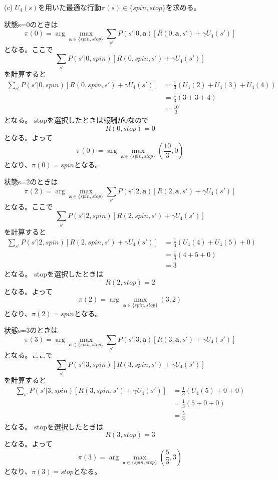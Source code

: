 \documentclass[a4paper,11pt,dvipdfmx]{jsarticle}
\begin{document}
(c)
\(U_4(s)\)を用いた最適な行動\(\pi(s) \in \{spin, stop\} \)を求める。

状態s=0のときは
\[\pi(0)=\arg\max_{\textbf{a}\in\{spin,stop\}}\sum_{s'}P(s'|0,\textbf{a})[R(0,\textbf{a},s')+\gamma U_4(s')]\]
となる。ここで
\[\sum_{s'}P(s'|0,spin)[R(0,spin,s')+\gamma U_4(s')]\]
を計算すると
\begin{align*}
    \sum_{s'}P(s'|0,spin)[R(0,spin,s')+\gamma U_4(s')] &= \frac{1}{3}(U_4(2)+U_4(3)+U_4(4)) \\
                                                     &= \frac{1}{3}(3+3+4) \\
                                                     &= \frac{10}{3}
\end{align*}
となる。
stopを選択したときは報酬が0なので
\[R(0,stop)=0\]
となる。よって
\[\pi(0)=\arg\max_{\textbf{a}\in\{spin,stop\}}(\frac{10}{3}, 0)\]
となり、\(\pi(0)=spin\)となる。

状態s=2のときは
\[\pi(2)=\arg\max_{\textbf{a}\in\{spin,stop\}}\sum_{s'}P(s'|2,\textbf{a})[R(2,\textbf{a},s')+\gamma U_4(s')]\]
となる。ここで
\[\sum_{s'}P(s'|2,spin)[R(2,spin,s')+\gamma U_4(s')]\]
を計算すると
\begin{align*}
    \sum_{s'}P(s'|2,spin)[R(2,spin,s')+\gamma U_4(s')] &= \frac{1}{3}(U_4(4)+U_4(5)+0) \\
                                                     &= \frac{1}{3}(4+5+0) \\
                                                     &= 3
\end{align*}
となる。
stopを選択したときは
\[R(2,stop)=2\]
となる。よって
\[\pi(2)=\arg\max_{\textbf{a}\in\{spin,stop\}}(3, 2)\]
となり、\(\pi(2)=spin\)となる。

状態s=3のときは
\[\pi(3)=\arg\max_{\textbf{a}\in\{spin,stop\}}\sum_{s'}P(s'|3,\textbf{a})[R(3,\textbf{a},s')+\gamma U_4(s')]\]
となる。ここで
\[\sum_{s'}P(s'|3,spin)[R(3,spin,s')+\gamma U_4(s')]\]
を計算すると
\begin{align*}
    \sum_{s'}P(s'|3,spin)[R(3,spin,s')+\gamma U_4(s')] &= \frac{1}{3}(U_4(5)+0+0) \\
                                                     &= \frac{1}{3}(5+0+0) \\
                                                     &= \frac{5}{3}
\end{align*}
となる。
stopを選択したときは
\[R(3,stop)=3\]
となる。よって
\[\pi(3)=\arg\max_{\textbf{a}\in\{spin,stop\}}(\frac{5}{3}, 3)\]
となり、\(\pi(3)=stop\)となる。
\end{document}
